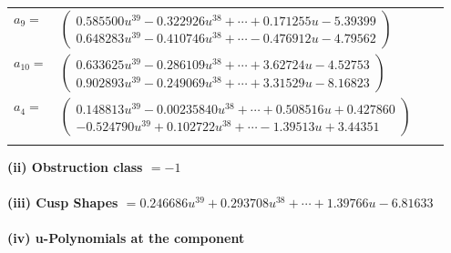 \documentclass[1p]{elsarticle_modified}
\theoremstyle{definition}
\begin{document}
\begin{tabular}{m{7pt} m{180pt} m{7pt} m{180pt} }
\flushright $a_{9}=$&$\begin{pmatrix}0.585500 u^{39}-0.322926 u^{38}+\cdots+0.171255 u-5.39399\\0.648283 u^{39}-0.410746 u^{38}+\cdots-0.476912 u-4.79562\end{pmatrix}$ \\
\flushright $a_{10}=$&$\begin{pmatrix}0.633625 u^{39}-0.286109 u^{38}+\cdots+3.62724 u-4.52753\\0.902893 u^{39}-0.249069 u^{38}+\cdots+3.31529 u-8.16823\end{pmatrix}$ \\
\flushright $a_{4}=$&$\begin{pmatrix}0.148813 u^{39}-0.00235840 u^{38}+\cdots+0.508516 u+0.427860\\-0.524790 u^{39}+0.102722 u^{38}+\cdots-1.39513 u+3.44351\end{pmatrix}$\\&\end{tabular}
\flushleft \textbf{(ii) Obstruction class $= -1$}\\~\\
\flushleft \textbf{(iii) Cusp Shapes $= 0.246686 u^{39}+0.293708 u^{38}+\cdots+1.39766 u-6.81633$}\\~\\
\newpage\renewcommand{\arraystretch}{1}
\flushleft \textbf{(iv) u-Polynomials at the component}\newline \\
\end{document}
